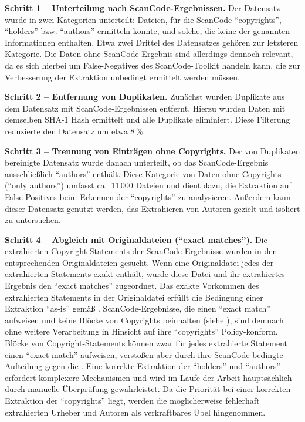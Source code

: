 \textbf{Schritt 1 -- Unterteilung nach ScanCode-Ergebnissen.}
Der Datensatz wurde in zwei Kategorien unterteilt: Dateien, für die ScanCode \enquote{copyrights}, \enquote{holders} bzw. \enquote{authors} ermitteln konnte, und solche, die keine der genannten Informationen enthalten.
Etwa zwei Drittel des Datensatzes gehören zur letzteren Kategorie.
Die Daten ohne ScanCode-Ergebnis sind allerdings dennoch relevant, da es sich hierbei um False-Negatives des ScanCode-Toolkit handeln kann, die zur Verbesserung der Extraktion unbedingt ermittelt werden müssen.

\textbf{Schritt 2 -- Entfernung von Duplikaten.}
Zunächst wurden Duplikate aus dem Datensatz mit ScanCode-Ergebnissen entfernt.
Hierzu wurden Daten mit demselben SHA-1 Hash ermittelt und alle Duplikate eliminiert.
Diese Filterung reduzierte den Datensatz um etwa 8\,\%.

\textbf{Schritt 3 -- Trennung von Einträgen ohne Copyrights.}
Der von Duplikaten bereinigte Datensatz wurde danach unterteilt, ob das ScanCode-Ergebnis ausschließlich \enquote{authors} enthält.
Diese Kategorie von Daten ohne Copyrights (\enquote{only authors}) umfasst ca.\ 11\,000 Dateien und dient dazu, die Extraktion auf False-Positives beim Erkennen der \enquote{copyrights} zu analysieren.
Außerdem kann dieser Datensatz genutzt werden, das Extrahieren von Autoren gezielt und isoliert zu untersuchen.

\textbf{Schritt 4 -- Abgleich mit Originaldateien (\enquote{exact matches}).}
Die extrahierten Copyright-Statements der ScanCode-Ergebnisse wurden in den entsprechenden Originaldateien gesucht.
Wenn eine Originaldatei jedes der extrahierten Statements exakt enthält, wurde diese Datei und ihr extrahiertes Ergebnis den \enquote{exact matches} zugeordnet.
Das exakte Vorkommen des extrahierten Statements in der Originaldatei erfüllt die Bedingung einer Extraktion \enquote{as-is} gemäß .
ScanCode-Ergebnisse, die einen \enquote{exact match} aufweisen und keine Blöcke von Copyrights beinhalten (siehe ), sind demnach ohne weitere Verarbeitung in Hinsicht auf ihre \enquote{copyrights} Policy-konform.
Blöcke von Copyright-Statements können zwar für jedes extrahierte Statement einen \enquote{exact match} aufweisen, verstoßen aber durch ihre ScanCode bedingte Aufteilung gegen die .
Eine korrekte Extraktion der \enquote{holders} und \enquote{authors} erfordert komplexere Mechanismen und wird im Laufe der Arbeit hauptsächlich durch manuelle Überprüfung gewährleistet.
Da die Priorität bei einer korrekten Extraktion der \enquote{copyrights} liegt, werden die möglicherweise fehlerhaft extrahierten Urheber und Autoren als verkraftbares Übel hingenommen.

